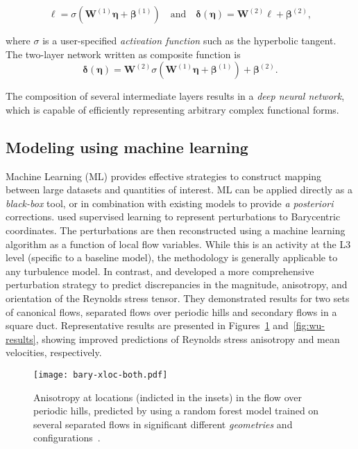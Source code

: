 \documentclass[a4paper]{ar-1col}
\begin{document}
\begin{textbox}[h]
\[
\bm{\ell} = \sigma \left( \bm{W}^{(1)}  \bm{\eta} + \bm{\beta}^{(1)}\right) \quad \text{and} \quad   \bm{\delta}(\bm{\eta}) = \bm{W}^{(2)} \bm{\ell} + \bm{\beta}^{(2)},
\]

\noindent where $\sigma$ is a user-specified \emph{activation function} such as the hyperbolic tangent. The two-layer network written as composite function is
\[
\bm{\delta}(\bm{\eta}) = \bm{W}^{(2)} \sigma \left(\bm{W}^{(1)}  \bm{\eta}  + \bm{\beta}^{(1)}\right) +  \bm{\beta}^{(2)}.
\]

 The composition of several intermediate layers results in a {\it deep neural network}, which is capable of efficiently representing arbitrary complex functional forms.
 
 

\end{textbox}

\subsection{Modeling using machine learning}

Machine Learning (ML)  provides effective strategies to construct mapping between large datasets and quantities of interest. ML can be applied directly as a {\it black-box} tool, or in combination with existing models  to provide {\it a posteriori} corrections. 
\citet{tracey2013application} used supervised learning to represent perturbations to Barycentric coordinates. The perturbations are then reconstructed using a machine learning algorithm as a function of local flow variables. While this is an activity at the L3 level (specific to a baseline model), the methodology is generally applicable to any turbulence model. In contrast, \citet{wang2017physics-informed} and \citet{wu2018data-driven} developed a more comprehensive perturbation strategy to predict discrepancies in the magnitude, anisotropy, and orientation of the Reynolds stress tensor. They demonstrated results for two sets of canonical flows, separated flows over periodic hills and secondary flows in a square duct. Representative results are presented in Figures~\ref{fig:piml-results} and~\ref{fig:wu-results}, showing improved predictions of Reynolds stress anisotropy and mean velocities, respectively.

\begin{figure}[!htbp]
  \centering
\texttt{[image: bary-xloc-both.pdf]}
  \caption{Anisotropy at locations (indicted in the insets) in the flow over periodic hills, predicted by using a random forest model trained on several separated flows in significant different \emph{geometries} and  configurations~\citep{wang2017physics-informed}.}
  \label{fig:piml-results}
\end{figure}
\end{document}
